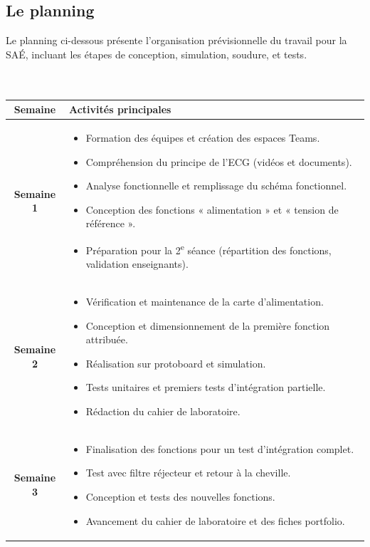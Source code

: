 \documentclass{article}
\begin{document}
\subsection{Le planning}

Le planning ci-dessous présente l'organisation prévisionnelle du travail pour la SAÉ, incluant les étapes de conception, simulation, soudure, et tests.\\ 
\\ 
\\
\begin{tabularx}{\textwidth}{|c|X|}
\hline
\textbf{Semaine} & \textbf{Activités principales} \\
\hline
\textbf{Semaine 1} & 
\begin{itemize}
  \item Formation des équipes et création des espaces Teams.
  \item Compréhension du principe de l’ECG (vidéos et documents).
  \item Analyse fonctionnelle et remplissage du schéma fonctionnel.
  \item Conception des fonctions « alimentation » et « tension de référence ».
  \item Préparation pour la 2\textsuperscript{e} séance (répartition des fonctions, validation enseignants).
\end{itemize} \\
\hline
\textbf{Semaine 2} &
\begin{itemize}
  \item Vérification et maintenance de la carte d’alimentation.
  \item Conception et dimensionnement de la première fonction attribuée.
  \item Réalisation sur protoboard et simulation.
  \item Tests unitaires et premiers tests d’intégration partielle.
  \item Rédaction du cahier de laboratoire.
\end{itemize} \\
\hline
\textbf{Semaine 3} &
\begin{itemize}
  \item Finalisation des fonctions pour un test d’intégration complet.
  \item Test avec filtre réjecteur et retour à la cheville.
  \item Conception et tests des nouvelles fonctions.
  \item Avancement du cahier de laboratoire et des fiches portfolio.
\end{itemize} \\
\hline
\end{tabularx}
\end{document}
